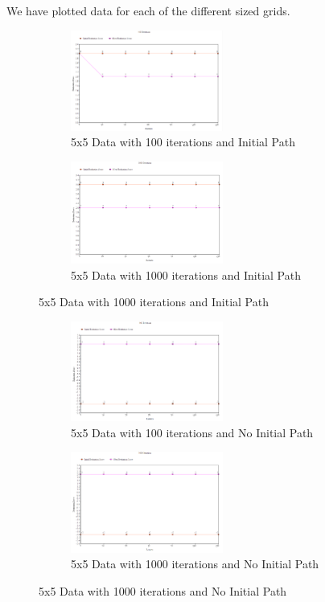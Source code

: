 \documentclass[11pt, oneside]{article}   	%
\begin{document}
We have plotted data for each of the different sized grids.

\begin{figure}[H]
\centering
\begin{subfigure}{.5\textwidth}
	\centering
	\includegraphics[width=50mm]{5x5restart.png}
	\caption{5x5 Data with 100 iterations and Initial Path}
	\label{fig:method}
\end{subfigure}%
\begin{subfigure}{.5\textwidth}
	\centering
	\includegraphics[width=50mm]{5x5restart2.png}
	\caption{5x5 Data with 1000 iterations and Initial Path}
	\label{fig:method}
\end{subfigure}
\end{figure}

\begin{figure}[H]
\centering
\begin{subfigure}{.5\textwidth}
	\centering
	\includegraphics[width=50mm]{5x5restPath.png}
	\caption{5x5 Data with 100 iterations and No Initial Path}
	\label{fig:method}
\end{subfigure}%
\begin{subfigure}{.5\textwidth}
	\centering
	\includegraphics[width=50mm]{5x5restPath2.png}
	\caption{5x5 Data with 1000 iterations and No Initial Path}
	\label{fig:method}
\end{subfigure}
\end{figure}
\end{document}
